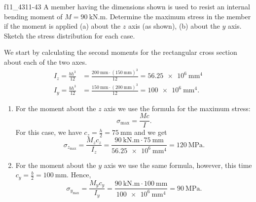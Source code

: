 
\begin{problemwithimage}{f11_43}{11-43}
  A member having the dimensions shown is used to resist an internal bending moment of $M = \qty{90}{\kN.\m}$.
  Determine the maximum stress in the member if the moment is applied (a) about the $z$ axis (as shown), (b) about the $y$ axis.
  Sketch the stress distribution for each case.
\end{problemwithimage}

\begin{derivation}
  We start by calculating the second moments for the rectangular cross section about each of the two axes.
  \begin{align*}
    I_z = \frac{bh^3}{12} &= \frac{\qty{200}{\mm} \cdot \left( \qty{150}{\mm}  \right)^3}{12}  = \qty{56,25e6}{\mm^4}\\
    I_y = \frac{bh^3}{12} &= \frac{\qty{150}{\mm} \cdot \left( \qty{200}{\mm}  \right)^3}{12} = \qty{100e6}{\mm^4}
  .\end{align*}

  \begin{enumerate}[label=(\alph*)]
    \item For the moment about the $z$ axis we use the formula for the maximum stress:
      \begin{equation*}
        \sigma_{\mathrm{max}} = \frac{Mc}{I}
      .\end{equation*}
      For this case, we have $c_z = \frac{h}{2} = \qty{75}{\mm}$ and we get
      \begin{equation*}
        \sigma_{z_{\mathrm{max}}} = \frac{M_z c_z}{I_z} = \frac{\qty{90}{\kN.\m} \cdot \qty{75}{\mm} }{\qty{56,25e6}{\mm^{4}} }  = \qty{120}{\MPa} 
      .\end{equation*}
    \item For the moment about the $y$ axis we use the same formula, however, this time $c_y = \frac{b}{2} = \qty{100}{\mm}$.
      Hence,
      \begin{equation*}
        \sigma_{y_{\mathrm{max}}} = \frac{M_y c_y}{I_y} = \frac{\qty{90}{\kN.\m} \cdot \qty{100}{\mm}}{\qty{100e6}{\mm^{4}} } = \qty{90}{\MPa} 
      .\end{equation*}
  \end{enumerate}
\end{derivation}


